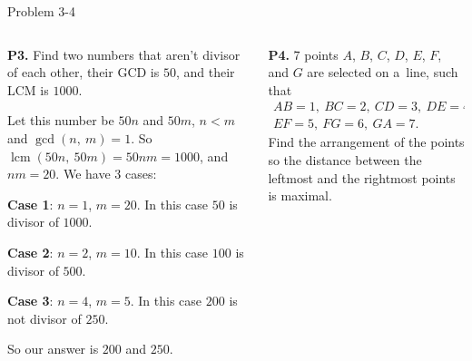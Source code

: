 \documentclass[9pt,aspectratio=169]{beamer}
\DeclareMathOperator{\lcm}{lcm}
\begin{document}
\begin{frame}{Problem 3-4}
  \begin{columns}[T]
    \begin{column}{0.5\textwidth}
      \begin{problem}
        \textbf{P3.} Find two numbers that aren't divisor of each other, their GCD is $50$, and their LCM is $1000$.
      \end{problem}
      Let this number be $50n$ and $50m$, $n < m$ and $\gcd(n,\ m) = 1$. So $\lcm(50n,\ 50m) = 50nm = 1000$, and $nm = 20$. We have $3$ cases:

      \textbf{Case 1}: $n = 1$, $m = 20$. In this case $50$ is divisor of $1000$.

      \textbf{Case 2}: $n = 2$, $m = 10$. In this case $100$ is divisor of $500$.

      \textbf{Case 3}: $n = 4$, $m = 5$. In this case $200$ is not divisor of $250$.

      So our answer is $200$ and $250$.
    \end{column}
    \begin{column}{0.5\textwidth}
      \vspace*{-2.2\baselineskip}
      \begin{problem}
        \textbf{P4.} 7 points $A$, $B$, $C$, $D$, $E$, $F$, and $G$ are selected on a~line, such that
        \begin{gather*}
          AB = 1,\ BC = 2,\ CD = 3,\ DE = 4,\\ 
          EF = 5,\ FG = 6,\ GA = 7.
        \end{gather*} 
        Find the arrangement of the points so the distance between the leftmost and the rightmost points is maximal.
      \end{problem}


\end{column}
\end{columns}
\end{frame}
\end{document}
